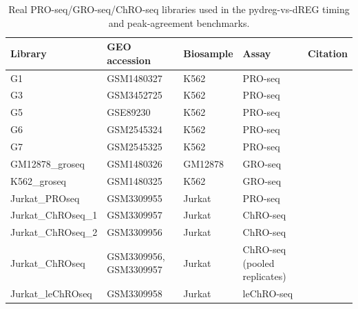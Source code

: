 \begin{table}[htbp]
\centering
\caption{Real PRO-seq/GRO-seq/ChRO-seq libraries used in the pydreg-vs-dREG
timing and peak-agreement benchmarks.}
\label{tab:benchmark-libraries}
\begin{tabular}{lllll}
\toprule
Library & GEO accession & Biosample & Assay & Citation \\
\midrule
G1                 & GSM1480327             & K562    & PRO-seq                      & \cite{core2014} \\
G3                 & GSM3452725             & K562    & PRO-seq                      & \cite{wang2019dreg} \\
G5                 & GSE89230               & K562    & PRO-seq                      & \cite{vihervaara2017} \\
G6                 & GSM2545324             & K562    & PRO-seq                      & \cite{dukler2017} \\
G7                 & GSM2545325             & K562    & PRO-seq                      & \cite{dukler2017} \\
GM12878\_groseq    & GSM1480326             & GM12878 & GRO-seq                       & \cite{core2014} \\
K562\_groseq       & GSM1480325             & K562    & GRO-seq                       & \cite{core2014} \\
Jurkat\_PROseq     & GSM3309955             & Jurkat  & PRO-seq                       & \cite{chu2018} \\
Jurkat\_ChROseq\_1 & GSM3309957             & Jurkat  & ChRO-seq                      & \cite{chu2018} \\
Jurkat\_ChROseq\_2 & GSM3309956             & Jurkat  & ChRO-seq                      & \cite{chu2018} \\
Jurkat\_ChROseq    & GSM3309956, GSM3309957 & Jurkat  & ChRO-seq (pooled replicates)  & \cite{chu2018} \\
Jurkat\_leChROseq  & GSM3309958             & Jurkat  & leChRO-seq                    & \cite{chu2018} \\
\bottomrule
\end{tabular}
\end{table}
